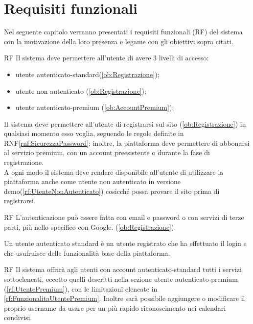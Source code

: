\section{Requisiti funzionali}
\label{sec:RequisitiFunzionali}

Nel seguente capitolo verranno presentati i requisiti funzionali (RF) del sistema con la motivazione della loro presenza e legame con gli obiettivi sopra citati.

\begin{listaPersonale}{RF}
	 Il sistema deve permettere all'utente di avere 3 livelli di accesso:
	\begin{itemize}
		\item utente autenticato-standard(\ref{ob:Registrazione});
		\item utente non autenticato (\ref{ob:Registrazione});
		\item utente autenticato-premium (\ref{ob:AccountPremium});
	\end{itemize}
	Il sistema deve permettere all'utente di registrarsi sul sito (\ref{ob:Registrazione}) in qualsiasi momento esso voglia, seguendo le regole definite in RNF\ref{rnf:SicurezzaPassword}; inoltre, la piattaforma deve permettere di abbonarsi al servizio premium, con un account preesistente o durante la fase di registrazione.\\
	A ogni modo il sistema deve rendere disponibile all'utente di utilizzare la piattaforma anche come utente non autenticato in versione demo(\ref{rf:UtenteNonAutenticato}) cosicché possa provare il sito prima di registrarsi.

	\begin{listaPersonale2}{RF}
		 L'autenticazione può essere fatta con email e password o con servizi di terze parti, più nello specifico con Google. (\ref{ob:Registrazione}).
	\end{listaPersonale2}

	 Un utente autenticato standard è un utente registrato che ha effettuato il login e che usufruisce delle funzionalità base della piattaforma.

	\begin{listaPersonale2}{RF}
		 Il sistema offrirà agli utenti con account autenticato-standard tutti i servizi sottoelencati, eccetto quelli descritti nella sezione utente autenticato-premium (\ref{rf:UtentePremium}), con le limitazioni elencate in \ref{rf:FunzionalitaUtentePremium}. Inoltre sarà possibile aggiungere o modificare il proprio username da usare per un più rapido riconoscimento nei calendari condivisi.


\end{listaPersonale2}
\end{listaPersonale}
